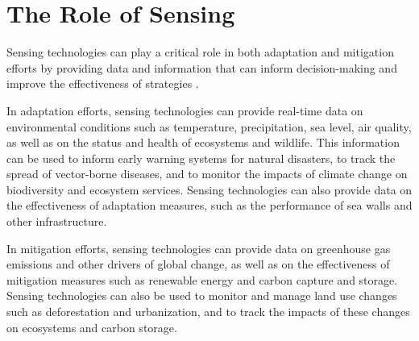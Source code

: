 \section{The Role of Sensing}

Sensing technologies can play a critical role in both adaptation and mitigation efforts by providing data and information that can inform decision-making and improve the effectiveness of strategies \cite{UNEP2017, NRC2010, CEN2017}.

In adaptation efforts, sensing technologies can provide real-time data on environmental conditions such as temperature, precipitation, sea level, air quality, as well as on the status and health of ecosystems and wildlife. This information can be used to inform early warning systems for natural disasters, to track the spread of vector-borne diseases, and to monitor the impacts of climate change on biodiversity and ecosystem services. Sensing technologies can also provide data on the effectiveness of adaptation measures, such as the performance of sea walls and other infrastructure.

In mitigation efforts, sensing technologies can provide data on greenhouse gas emissions and other drivers of global change, as well as on the effectiveness of mitigation measures such as renewable energy and carbon capture and storage. Sensing technologies can also be used to monitor and manage land use changes such as deforestation and urbanization, and to track the impacts of these changes on ecosystems and carbon storage.

